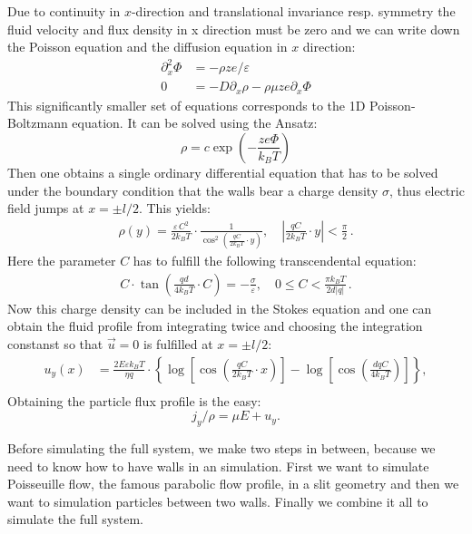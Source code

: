Due to continuity in $x$-direction and translational invariance resp.
symmetry the fluid velocity and flux density in x direction must be zero and we can 
write down the Poisson equation and the diffusion equation in 
$x$ direction:
\begin{align}
  \partial^2_x \Phi &= -\rho z e/\varepsilon \\
	0 &=-D\partial_x\rho-\rho\mu z e \partial_x\Phi
\end{align}
This significantly smaller set of equations corresponds
to the 1D Poisson-Boltzmann equation. It can be solved
using the Ansatz:
\begin{equation}
  \rho = c \exp\left(-\frac{z e \Phi}{k_B T}\right)
\end{equation}
Then one obtains a single ordinary differential
equation that has to be solved under the boundary 
condition that the walls bear a charge density $\sigma$,
thus electric field jumps at $x=\pm l/2$. This
yields:
\begin{align*}
		\rho(y)=\frac{\varepsilon\,C^2}{2 k_B T}\cdot\frac 1 {\cos^2\left(\frac{qC}{2k_B T}\cdot y\right)},\quad \left|\frac{qC}{2k_B T}\cdot y\right|<\frac\pi 2\,.
	\end{align*}
Here the parameter $C$ has to fulfill the following transcendental
equation:
	\begin{align*}
		C\cdot\tan\left(\frac{qd}{4k_B T}\cdot C\right)=-\frac\sigma\varepsilon,\quad 0\le C<\frac{\pi k_B T}{2d|q|}\,.
	\end{align*}
Now this charge density can be included in the Stokes equation
and one can obtain the fluid profile from integrating twice
and choosing the integration constanst so that $\vec u=0$ is fulfilled
at $x=\pm l/2$:
	\begin{align*}
		u_y(x)&=\frac{2E\varepsilon k_B T}{\eta q}\cdot\left\{\log\left[\cos\left(\frac{qC}{2k_B T}\cdot x\right)\right]-\log\left[\cos\left(\frac{dqC}{4k_B T}\right)\right]\right\},\\
	\end{align*}
Obtaining the particle flux profile is the easy:
\begin{equation}
  j_y / \rho = \mu E + u_y.
\end{equation}

Before simulating the full system, we make two steps in between, because
we need to know how to have walls in an \ES{} simulation. First we want
to simulate Poisseuille flow, the famous parabolic flow profile, in a slit
geometry and then we want to simulation particles between two walls. Finally
we combine it all to simulate the full system.
